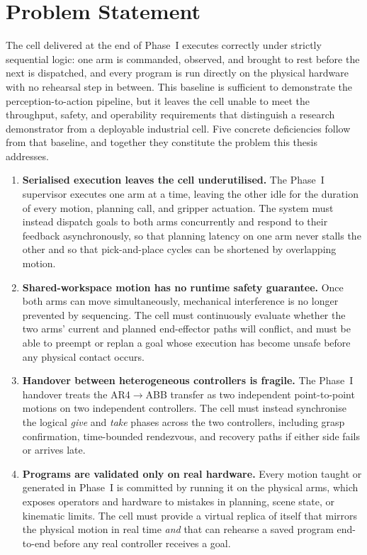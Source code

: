 \section{Problem Statement}
The cell delivered at the end of Phase~I executes correctly under strictly sequential logic: one arm is commanded, observed, and brought to rest before the next is dispatched, and every program is run directly on the physical hardware with no rehearsal step in between. This baseline is sufficient to demonstrate the perception-to-action pipeline, but it leaves the cell unable to meet the throughput, safety, and operability requirements that distinguish a research demonstrator from a deployable industrial cell. Five concrete deficiencies follow from that baseline, and together they constitute the problem this thesis addresses.

\begin{enumerate}
    \item \textbf{Serialised execution leaves the cell underutilised.} The Phase~I supervisor executes one arm at a time, leaving the other idle for the duration of every motion, planning call, and gripper actuation. The system must instead dispatch goals to both arms concurrently and respond to their feedback asynchronously, so that planning latency on one arm never stalls the other and so that pick-and-place cycles can be shortened by overlapping motion.

    \item \textbf{Shared-workspace motion has no runtime safety guarantee.} Once both arms can move simultaneously, mechanical interference is no longer prevented by sequencing. The cell must continuously evaluate whether the two arms' current and planned end-effector paths will conflict, and must be able to preempt or replan a goal whose execution has become unsafe before any physical contact occurs.

    \item \textbf{Handover between heterogeneous controllers is fragile.} The Phase~I handover treats the AR4$\rightarrow$ABB transfer as two independent point-to-point motions on two independent controllers. The cell must instead synchronise the logical \emph{give} and \emph{take} phases across the two controllers, including grasp confirmation, time-bounded rendezvous, and recovery paths if either side fails or arrives late.

    \item \textbf{Programs are validated only on real hardware.} Every motion taught or generated in Phase~I is committed by running it on the physical arms, which exposes operators and hardware to mistakes in planning, scene state, or kinematic limits. The cell must provide a virtual replica of itself that mirrors the physical motion in real time \emph{and} that can rehearse a saved program end-to-end before any real controller receives a goal.


\end{enumerate}
